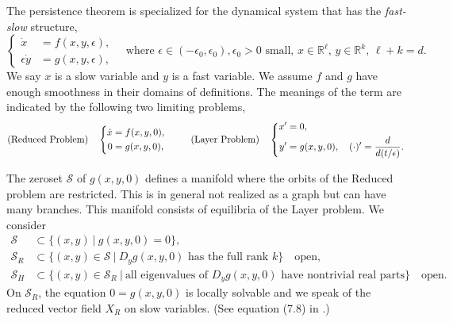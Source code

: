 \documentclass[a4paper,11pt]{article}
\theoremstyle{remark}
\begin{document}
The persistence theorem is specialized for the dynamical system that has the {\it fast-slow} structure, 
\begin{equation} \label{eq:fast-slow}
 \left\{
 \begin{aligned}
  \dot{x}&=f(x,y,\epsilon),\\
  \epsilon\dot{y}&=g(x,y,\epsilon),
 \end{aligned}\right. \quad \text{where $\epsilon \in (-\epsilon_0,\epsilon_0), \epsilon_0>0$ small, $x\in \mathbb{R}^\ell$, $y\in \mathbb{R}^k$, $\ell+k=d$.}
\end{equation}
We say $x$ is a slow variable and $y$ is a fast variable. We assume $f$ and $g$ have enough smoothness in their domains of definitions. The meanings of the term are indicated by the following two limiting problems,
\begin{equation*} %
 \text{(Reduced Problem)}\quad\left\{
 \begin{aligned}
    \dot{x} &= f(x,y,0),\\
    0&= g(x,y,0),
 \end{aligned}\right. 
 \hspace{2.5em}
 \text{(Layer Problem)} \quad  
 \left\{
 \begin{aligned}
    x'&= 0,\\
    y'&= g(x,y,0), \quad (\cdot)' = \frac{d}{d(t/\epsilon)}.%
 \end{aligned}\right. 
\end{equation*}

The zeroset $\mathcal{S}$ of $g(x,y,0)$ defines a manifold where the orbits of the Reduced problem are restricted. This is in general not realized as a graph but can have many branches. This manifold consists of equilibria of the Layer problem. We consider 
\begin{align*}
 \mathcal{S}&\subset \Big\{ (x,y)\:\Big|\: g(x,y,0)=0\Big\},\\
 \mathcal{S}_R&\subset \Big\{ (x,y)\in \mathcal{S} \:\Big|\: \text{$D_y g(x,y,0)$ has the full rank $k$}\Big\} \quad \text{open},\\
 \mathcal{S}_H&\subset \Big\{ (x,y)\in \mathcal{S}_R \:\Big|\: \text{all eigenvalues of $D_y g(x,y,0)$ have nontrivial real parts}\Big\}\quad \text{open}. 
\end{align*}
On $\mathcal{S}_R$, the equation $0=g(x,y,0)$ is locally solvable and we speak of the reduced vector field $X_R$ on slow variables. (See equation (7.8) in \cite{fenichel_geometric_1979}.) %
\end{document}
